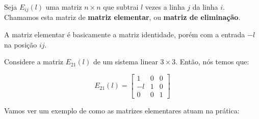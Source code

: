\begin{Definition}
	Seja $E_{ij}(l)$ uma matriz $n\times n$ que subtrai $l$ vezes a linha $j$ da linha $i$. Chamamos esta matriz de \textbf{matriz elementar}, ou \textbf{matriz de eliminação}.
\end{Definition}

A matriz elementar é basicamente a matriz identidade, porém com a entrada $-l$ na posição $ij$.

\begin{Example}
	Considere a matriz $E_{21}(l)$ de um sistema linear $3\times 3$. Então, nós temos que:
	
	$$
	E_{21}(l) = \begin{bmatrix}
		1 & 0 & 0 \\
		-l & 1 & 0 \\
		0 & 0 & 1
	\end{bmatrix}
	$$
\end{Example}

Vamos ver um exemplo de como as matrizes elementares atuam na prática:

